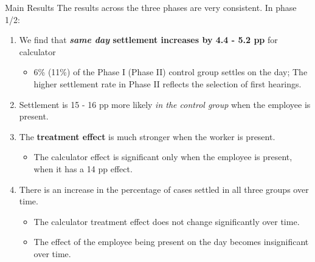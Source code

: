\documentclass[9pt]{beamer}
\begin{document}
\begin{frame}{Main Results}
\label{frame_Main_Results}
The results across the three phases are very consistent. In phase 1/2:
    \begin{enumerate}
        \item We find that \textbf{\textit{same day} settlement increases by 4.4 - 5.2 pp} for calculator 
        \begin{itemize}
            \item 6\% (11\%) of the Phase I (Phase II) control group settles on the day; The higher settlement rate in Phase II reflects the selection of first hearings.
               	\hyperlink{frame_Table3A}{}
               	 \end{itemize}
        \vspace{2mm}
    \pause
    \label{frame_Main_Resultsb}
        \item Settlement is 15 - 16 pp more likely \textit{in the control group} when the employee is present.
          \vspace{2mm}
        \item The \textbf{treatment effect} is much stronger when the worker is present.
            \begin{itemize}
                \item The calculator effect is significant only when the employee is present, when it has a 14 pp effect. 
        	\hyperlink{frame_Table3B}{}
            \end{itemize}
        \pause
          \label{frame_Main_Resultsc}
            \item There is an increase in the percentage of cases settled in all three groups over time. 
         \begin{itemize}
             \item The calculator treatment effect does not change significantly over time.
             \item The effect of the employee being present on the day becomes insignificant over time. 
	\hyperlink{frame_Table3C}{}
         \end{itemize}
    
    \end{enumerate}
 
  \end{frame}
 
\end{document}

